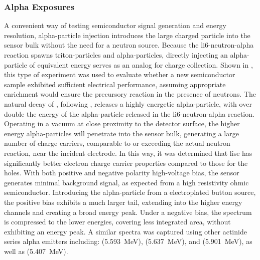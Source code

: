 \documentclass[../../../main.tex]{subfiles}%
\begin{document}
%
    \Xsubsection%
    \subsubsection*{Alpha Exposures}%
    \label{sec:chapter-4:semiconductor-response:alpha}%
    A convenient way of testing semiconductor signal generation and energy resolution, \gls{alpha-particle} injection introduces the large charged particle into the sensor bulk without the need for a neutron source.
    Because the \gls{li6-neutron-alpha} reaction spawns \glspl{triton-particle} and \glspl{alpha-particle}, directly injecting an \gls{alpha-particle} of equivalent energy serves as an analog for charge collection.
    Shown in , this type of experiment was used to evaluate whether a new semiconductor sample exhibited sufficient electrical performance, assuming appropriate  enrichment would ensure the precursory reaction in the presence of neutrons. 
    The natural decay of , following , releases a highly energetic \gls{alpha-particle}, with over double the energy of the \gls{alpha-particle} released in the \gls{li6-neutron-alpha} reaction. 
    Operating in a vacuum at close proximity to the detector surface, the higher energy \glspl{alpha-particle} will penetrate into the sensor bulk, generating a large number of charge carriers, comparable to or exceeding the actual neutron reaction, near the incident electrode.
    In this way, it was determined that \gls{lise} has significantly better electron charge carrier properties compared to those for the holes.
    With both positive and negative polarity \gls{high-voltage} bias, the sensor generates minimal background signal, as expected from a high resistivity ohmic semiconductor.
    Introducing the \gls{alpha-particle} from a  electroplated button source, the positive bias exhibits a much larger tail, extending into the higher energy channels and creating a broad energy peak.
    Under a negative bias, the spectrum is compressed to the lower energies, covering less integrated area, without exhibiting an energy peak.
    A similar spectra was captured using other actinide series alpha emitters including:  (\SI{5.593}{\mega\electronvolt}),  (\SI{5.637}{\mega\electronvolt}), and  (\SI{5.901}{\mega\electronvolt}), as well as  (\SI{5.407}{\mega\electronvolt}).
\end{document}
